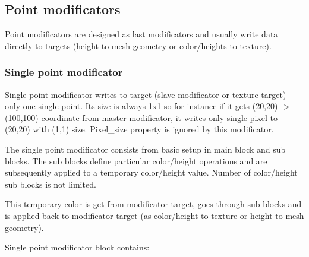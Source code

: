\documentclass[11pt]{article}
\begin{document}
\subsection{Point modificators}

Point modificators are designed as last modificators and usually write
data directly to targets (height to mesh geometry or color/heights to texture). 

\subsubsection{Single point modificator}

Single point modificator writes to target (slave modificator
or texture target) only one single point. Its size is always 1x1 so for instance
if it gets (20,20) -> (100,100) coordinate from master modificator, it writes
only single pixel to (20,20) with (1,1) size. Pixel\_size property is ignored 
by this modificator.

The single point modificator consists from basic setup in main block and
sub blocks. The sub blocks define particular color/height operations and 
are subsequently applied to a temporary color/height value. Number of 
color/height sub blocks is not limited.

This temporary color is get from modificator target, goes through sub blocks
and is applied back to modificator target (as color/height to texture or
height to mesh geometry). 

Single point modificator block contains:
\end{document}
